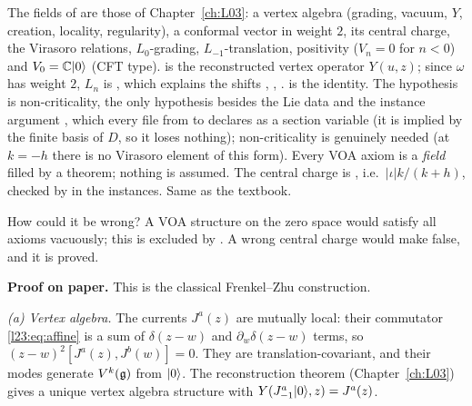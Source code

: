 \begin{dictionary}
The fields of  are those of Chapter~\ref{ch:L03}: a vertex algebra (grading, vacuum,
$Y$, creation, locality, regularity), a conformal vector in weight $2$, its central charge, the Virasoro relations,
$L_0$-grading, $L_{-1}$-translation, positivity ($V_n=0$ for $n<0$) and $V_0={\mathbb{C}}|0\rangle$ (CFT type). 
is the reconstructed vertex operator $Y(u,z)$; since $\omega$ has weight $2$, $L_n$ is , which
explains the shifts , , .  is the identity. The hypothesis
 is non-criticality, the only hypothesis besides the Lie data and the instance argument
\lean{[FiniteDimensional ℂ 𝔤]}, which every file from  to  declares as a
section variable (it is implied by the finite basis of $D$, so it loses nothing); non-criticality is genuinely needed (at $k=-h$ there is no
Virasoro element of this form). Every VOA axiom is a \emph{field} filled by a theorem; nothing is assumed. The central
charge is , i.e.\ $|\iota|k/(k+h)$, checked by  in the instances. Same as the
textbook.

How could it be wrong? A VOA structure on the zero space would satisfy all axioms vacuously; this is excluded by
. A wrong central charge would make  false, and it is proved.
\end{dictionary}

\textbf{Proof on paper.} This is the classical Frenkel--Zhu construction. 

\emph{(a) Vertex algebra.} The currents $J^a(z)$ are mutually local: their commutator \eqref{l23:eq:affine} is a sum of
$\delta(z-w)$ and $\partial_w\delta(z-w)$ terms, so $(z-w)^2[J^a(z),J^b(w)]=0$. They are translation-covariant, and their modes
generate $V^k(\mathfrak g)$ from $|0\rangle$. The reconstruction theorem (Chapter~\ref{ch:L03}) gives a unique vertex algebra structure
with $Y(J^a_{-1}|0\rangle,z)=J^a(z)$.

